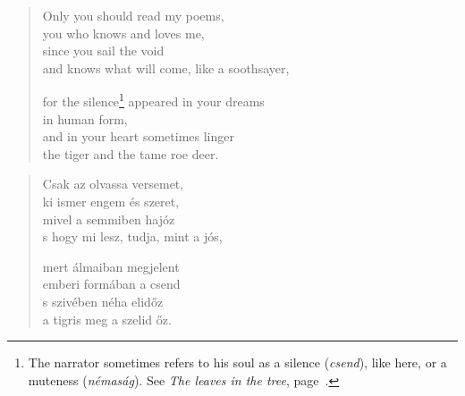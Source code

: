 \documentclass[11pt]{book}
\newcommand*{\centeredornament}{\centerline{\pgfornament[width=6cm]{88}}}
\begin{document}
\begin{verse}
  Only you should read my poems, \\
  you who knows and loves me, \\
  since you sail the void \\
  and knows what will come, like a soothsayer,

  for the silence\footnote{The narrator sometimes refers to his soul
  as a silence (\emph{csend}), like here, or a muteness
  (\emph{némaság}). See \emph{The leaves in the tree},
  page~\pageref{the_leaves_in_the_tree}.} appeared in your dreams \\
  in human form, \\
  and in your heart sometimes linger \\
  the tiger and the tame roe deer.
\end{verse}

\newpage

\vspace*{-15mm}
\centeredornament



\begin{verse}
  Csak az olvassa versemet, \\
  ki ismer engem és szeret, \\
  mivel a semmiben hajóz \\
  s hogy mi lesz, tudja, mint a jós,

  mert álmaiban megjelent \\
  emberi formában a csend \\
  s szivében néha elidőz \\
  a tigris meg a szelid őz.
\end{verse}

\newpage

\vspace*{-15mm}
\centeredornament


\end{document}
